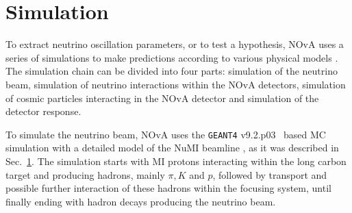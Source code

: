 \section{Simulation}\label{sec:NOvASimulation}


To extract neutrino oscillation parameters, or to test a hypothesis, \gls{NOvA} uses a series of simulations to make predictions according to various physical models \cite{NOvASimulationOld-Fluka.pdf}.
The simulation chain can be divided into four parts: simulation of the neutrino beam, simulation of neutrino interactions within the \gls{NOvA} detectors, simulation of cosmic particles interacting in the \gls{NOvA} detector and simulation of the detector response.

To simulate the neutrino beam, \gls{NOvA} uses the \texttt{GEANT4} v9.2.p03~\cite{GEANT4.pdf} based \gls{MC} simulation with a detailed model of the \gls{NuMI} beamline \cite{ZPavlovicThesisG4NuMI_2008.pdf}, as it was described in Sec.~\ref{sec:NOvASimulation}. The simulation starts with \gls{MI} protons interacting within the long carbon target and producing hadrons, mainly $\pi, K$ and $p$, followed by transport and possible further interaction of these hadrons within the focusing system, until finally ending with hadron decays producing the neutrino beam.

